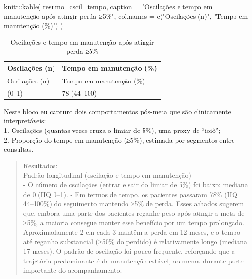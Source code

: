 \documentclass[
]{article}
\newenvironment{Shaded}{\begin{snugshade}}{\end{snugshade}}
\newcommand{\AttributeTok}[1]{\textcolor[rgb]{0.40,0.45,0.13}{#1}}
\newcommand{\FunctionTok}[1]{\textcolor[rgb]{0.28,0.35,0.67}{#1}}
\newcommand{\NormalTok}[1]{\textcolor[rgb]{0.00,0.23,0.31}{#1}}
\newcommand{\SpecialCharTok}[1]{\textcolor[rgb]{0.37,0.37,0.37}{#1}}
\newcommand{\StringTok}[1]{\textcolor[rgb]{0.13,0.47,0.30}{#1}}
\begin{document}
\begin{Shaded}
\begin{Highlighting}[]
\NormalTok{knitr}\SpecialCharTok{::}\FunctionTok{kable}\NormalTok{(}
\NormalTok{  resumo\_oscil\_tempo,}
  \AttributeTok{caption =} \StringTok{"Oscilações e tempo em manutenção após atingir perda ≥5\%"}\NormalTok{,}
  \AttributeTok{col.names =} \FunctionTok{c}\NormalTok{(}\StringTok{"Oscilações (n)"}\NormalTok{, }\StringTok{"Tempo em manutenção (\%)"}\NormalTok{)}
\NormalTok{)}
\end{Highlighting}
\end{Shaded}

\begin{longtable}[]{@{}ll@{}}
\caption{Oscilações e tempo em manutenção após atingir perda
≥5\%}\tabularnewline
\toprule\noalign{}
Oscilações (n) & Tempo em manutenção (\%) \\
\midrule\noalign{}
\endfirsthead
\toprule\noalign{}
Oscilações (n) & Tempo em manutenção (\%) \\
\midrule\noalign{}
\endhead
\bottomrule\noalign{}
\endlastfoot
0 (0--1) & 78 (44--100) \\
\end{longtable}

Neste bloco eu capturo dois comportamentos pós-meta que são clinicamente
interpretáveis:\\
1. Oscilações (quantas vezes cruza o limiar de 5\%), uma proxy de
``ioiô'';\\
2. Proporção do tempo em manutenção (≥5\%), estimada por segmentos entre
consultas.\\

\begin{quote}
Resultados:\\
Padrão longitudinal (oscilação e tempo em manutenção)\\
- O número de oscilações (entrar e sair do limiar de 5\%) foi baixo:
mediana de 0 (IIQ 0--1). - Em termos de tempo, os pacientes passaram
78\% (IIQ 44--100\%) do seguimento mantendo ≥5\% de perda. Esses achados
sugerem que, embora uma parte dos pacientes reganhe peso após atingir a
meta de ≥5\%, a maioria consegue manter esse benefício por um tempo
prolongado. Aproximadamente 2 em cada 3 mantêm a perda em 12 meses, e o
tempo até reganho substancial (≥50\% do perdido) é relativamente longo
(mediana 17 meses). O padrão de oscilação foi pouco frequente,
reforçando que a trajetória predominante é de manutenção estável, ao
menos durante parte importante do acompanhamento.
\end{quote}
\end{document}
